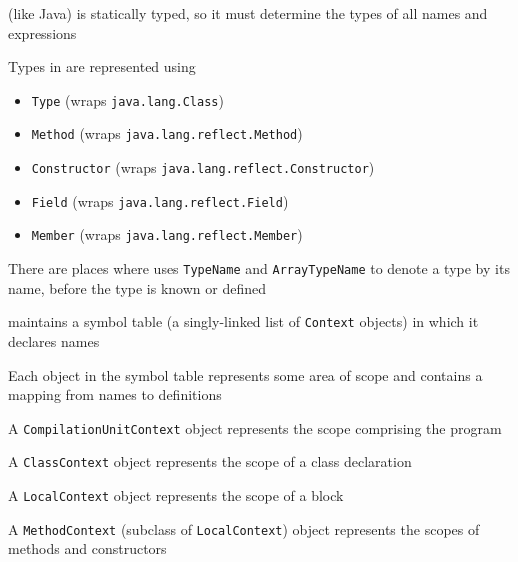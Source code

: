 \documentclass[8pt,a4paper,compress]{beamer}
\begin{document}
\begin{frame}[fragile]
\pause\transdissolve

\jmm (like Java) is statically typed, so it must determine the types of all names and expressions

\pause\transdissolve\bigskip

Types in \jmm are represented using
\begin{itemize}
\pause\transdissolve
\item \lstinline{Type} (wraps \lstinline{java.lang.Class})

\pause\transdissolve
\item \lstinline{Method} (wraps \lstinline{java.lang.reflect.Method})

\pause\transdissolve
\item \lstinline{Constructor} (wraps \lstinline{java.lang.reflect.Constructor})

\pause\transdissolve
\item \lstinline{Field} (wraps \lstinline{java.lang.reflect.Field})

\pause\transdissolve
\item \lstinline{Member} (wraps \lstinline{java.lang.reflect.Member})
\end{itemize}

\pause\transdissolve\bigskip

There are places where \jmm uses \lstinline{TypeName} and \lstinline{ArrayTypeName} to denote a type by its name, before the type is known or defined
\end{frame}

\begin{frame}[fragile]
\pause\transdissolve

\jmm maintains a symbol table (a singly-linked list of \lstinline{Context} objects) in which it declares names

\pause\transdissolve\bigskip

Each object in the symbol table represents some area of scope and contains a mapping from names to definitions

\pause\transdissolve\bigskip

A \lstinline{CompilationUnitContext} object represents the scope comprising the program

\pause\transdissolve\bigskip

A \lstinline{ClassContext} object represents the scope of a class declaration

\pause\transdissolve\bigskip

A \lstinline{LocalContext} object represents the scope of a block

\pause\transdissolve\bigskip

A \lstinline{MethodContext} (subclass of \lstinline{LocalContext}) object represents the scopes of methods and constructors
\end{frame}
\end{document}
